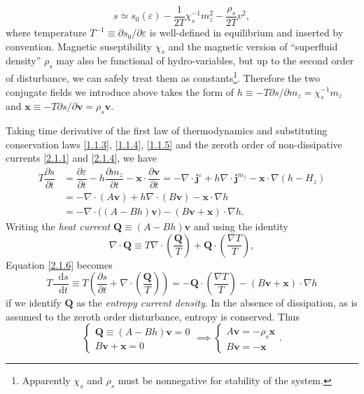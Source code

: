 \documentclass[10pt,nofootinbib]{revtex4}
\newcommand*\dd{\mathop{}\!\mathrm{d}}
\begin{document}
			\begin{equation}\label{2.1.5}
				s\simeq s_0(\varepsilon)-\dfrac{1}{2T}\chi_s^{-1}m_z^2-\dfrac{\rho_s}{2T}v^2,
			\end{equation}
			where temperature $T^{-1}\equiv\partial s_0/\partial\varepsilon$ is well-defined in equilibrium and inserted by convention. Magnetic suseptibility $\chi_s$ and the magnetic version of ``superfluid density'' $\rho_s$ may also be functional of hydro-variables, but up to the second order of disturbance, we can safely treat them as constants\footnote{Apparently $\chi_s$ and $\rho_s$ must be nonnegative for stability of the system.}. Therefore the two conjugate fields we introduce above takes the form of $h\equiv-T \partial s/\partial m_z=\chi_s^{-1}m_z$ and $\bm{x}\equiv-T\partial s/\partial \bm{v}=\rho_s\bm{v}$.\par
			Taking time derivative of the first law of thermodynamics and substituting conservation laws \eqref{1.1.3}, \eqref{1.1.4}, \eqref{1.1.5} and the zeroth order of non-dissipative currents \eqref{2.1.1} and \eqref{2.1.4}, we have
			\begin{align}\label{2.1.6}
				T\dfrac{\partial s}{\partial t}&=\dfrac{\partial \varepsilon}{\partial t}-h\dfrac{\partial m_z}{\partial t}-\bm{x}\cdot\dfrac{\partial \bm{v}}{\partial t}=-\nabla\cdot\bm{j}^\varepsilon+h\nabla\cdot\bm{j}^{m_z}-\bm{x}\cdot\nabla(h-H_z)\nonumber\\
				&=-\nabla\cdot(A\bm{v})+h\nabla\cdot(B\bm{v})-\bm{x}\cdot\nabla h\nonumber\\
				&=-\nabla\cdot\bigg((A-Bh)\bm{v}\bigg)-(B\bm{v}+\bm{x})\cdot\nabla h.
			\end{align}
			Writing the \emph{heat current} $\bm{Q}\equiv (A-Bh)\bm{v}$ and using the identity
			\begin{equation*}
				\nabla\cdot\bm{Q}\equiv T\nabla\cdot \left(\dfrac{\bm{Q}}{T}\right)+\bm{Q}\cdot \left(\dfrac{\nabla T}{T}\right),  
			\end{equation*}
			Equation \eqref{2.1.6} becomes
			\begin{equation}\label{2.1.7}
				T\dfrac{\dd s}{\dd t}\equiv T \left(\dfrac{\partial s}{\partial t}+\nabla\cdot \left(\dfrac{\bm{Q}}{T}\right) \right)=-\bm{Q}\cdot \left(\dfrac{\nabla T}{T}\right)-(B\bm{v}+\bm{x})\cdot\nabla h
			\end{equation}
			if we identify $\bm{Q}$ as the \emph{entropy current density}. In the absence of dissipation, as is assumed to the zeroth order disturbance, entropy is conserved. Thus
			\begin{equation}\label{2.1.8}
				\begin{cases}
					\bm{Q}\equiv (A-Bh)\bm{v}=0\\
					B\bm{v}+\bm{x}=0
				\end{cases}\implies
				\begin{cases}
					A\bm{v}=-\rho_s\bm{x}\\
					B\bm{v}=-\bm{x}
				\end{cases}.
			\end{equation}
\end{document}
